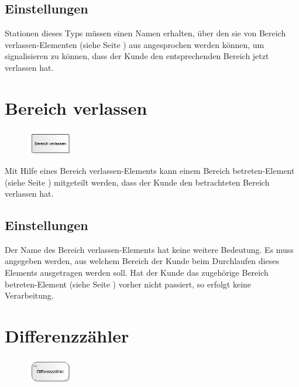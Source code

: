 \subsection*{Einstellungen}

Stationen dieses Typs müssen einen Namen erhalten, über den sie von
Bereich verlassen-Elementen (siehe Seite \pageref{ref:ModelElementSectionEnd}) 
aus angesprochen werden können, um signalisieren zu können, dass der
Kunde den entsprechenden Bereich jetzt verlassen hat.


\section{Bereich verlassen}
\label{ref:ModelElementSectionEnd}

\begin{figure}
\vspace{-22pt}
\includegraphics[width=2cm]{imageModelElementSectionEnd.png}
\vspace{-22pt}
\end{figure}

Mit Hilfe eines Bereich verlassen-Elements kann einem
Bereich betreten-Element (siehe Seite \pageref{ref:ModelElementSectionStart}) 
mitgeteilt werden, dass der Kunde den betrachteten Bereich verlassen hat.

\subsection*{Einstellungen}

Der Name des Bereich verlassen-Elements hat keine weitere Bedeutung.
Es muss angegeben werden, aus welchem Bereich der Kunde beim Durchlaufen dieses
Elements ausgetragen werden soll. Hat der Kunde das zugehörige
Bereich betreten-Element (siehe Seite \pageref{ref:ModelElementSectionStart}) 
vorher nicht passiert, so erfolgt keine Verarbeitung.


\section{Differenzzähler}
\label{ref:ModelElementDifferentialCounter}

\begin{figure}
\vspace{-22pt}
\includegraphics[width=2cm]{imageModelElementDifferentialCounter.png}
\vspace{-22pt}
\end{figure}

